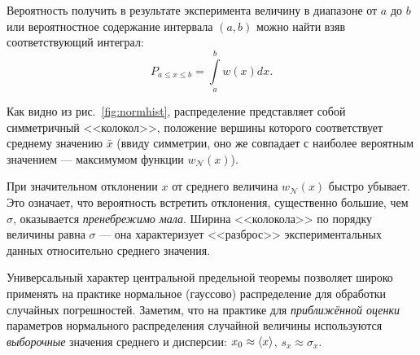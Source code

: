 Вероятность получить в результате эксперимента величину в диапазоне от $a$ до $b$ или вероятностное содержание интервала $(a,b)$ можно найти взяв соответствующий интеграл:
\begin{equation}
    P_{a\le x\le b}=\int\limits _{a}^{b}w\!\left(x\right)dx.\label{eq:P}
\end{equation}

Как видно из рис.~\ref{fig:normhist}, распределение представляет собой симметричный
<<колокол>>, положение вершины которого
соответствует среднему значению $\bar{x}$ (ввиду симметрии, оно же
совпадает с наиболее вероятным значением --- максимумом
функции $w_{\mathcal{N}}(x)$).

%     


При значительном отклонении $x$ от среднего величина $w_{\mathcal{N}}\!\left(x\right)$
быстро убывает. Это означает, что вероятность встретить отклонения,
существенно большие, чем $\sigma$, оказывается \emph{пренебрежимо
мала}. Ширина <<колокола>> по порядку величины
равна $\sigma$ --- она характеризует <<разброс>>
экспериментальных данных относительно среднего значения.


Универсальный характер центральной предельной теоремы позволяет широко
применять на практике нормальное (гауссово) распределение для обработки
случайных погрешностей. Заметим, что на практике для \emph{приближённой
оценки} параметров нормального распределения случайной величины используются
\emph{выборочные} значения среднего и дисперсии: $x_{0}\approx\left<x\right>$,
$s_{x}\approx\sigma_{x}$.

